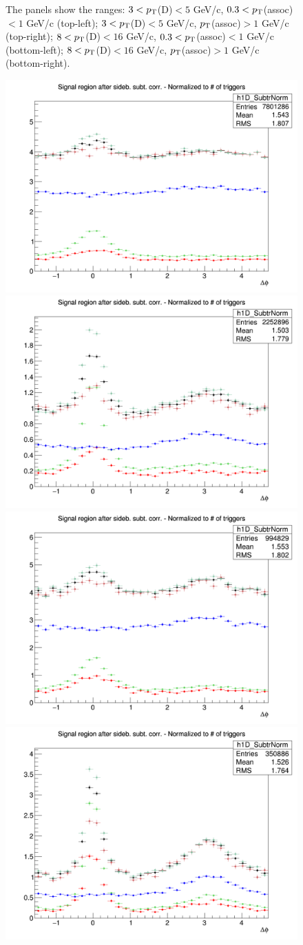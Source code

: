 \begin{figure}
{The panels show the ranges: $3 < p_{\rm T}$(D)$ < 5$ GeV/c, $0.3 < p_{\rm T}$(assoc)$ < 1$ GeV/c (top-left); $3 < p_{\rm T}$(D)$ < 5$ GeV/c, $p_{\rm T}$(assoc)$ > 1$ GeV/c (top-right); $8 < p_{\rm T}$(D)$ < 16$ GeV/c, $0.3 < p_{\rm T}$(assoc)$ < 1$ GeV/c (bottom-left); $8 < p_{\rm T}$(D)$ < 16$ GeV/c, $p_{\rm T}$(assoc)$ > 1$ GeV/c (bottom-right).}
\label{fig:MC_Kine}
\end{figure}

\begin{figure}
{\includegraphics[width=.48\linewidth]{figures/MC_closure/AzimCorrDistr_Dzero_Canvas_PtIntBins4to5_PoolInt_thr03to1_Superimposed_Reco.png}}
{\includegraphics[width=.48\linewidth]{figures/MC_closure/AzimCorrDistr_Dzero_Canvas_PtIntBins4to5_PoolInt_thr1to99_Superimposed_Reco.png}} \\
{\includegraphics[width=.48\linewidth]{figures/MC_closure/AzimCorrDistr_Dzero_Canvas_PtIntBins9to10_PoolInt_thr03to1_Superimposed_Reco.png}}
{\includegraphics[width=.48\linewidth]{figures/MC_closure/AzimCorrDistr_Dzero_Canvas_PtIntBins9to10_PoolInt_thr1to99_Superimposed_Reco.png}}

\end{figure}
